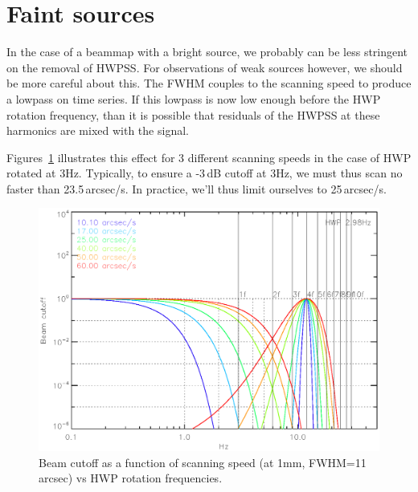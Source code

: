 \documentclass[a4paper,10pt]{article}
\begin{document}
\section{Faint sources}

In the case of a beammap with a bright source, we probably can be less stringent
on the removal of HWPSS. For observations of weak sources however, we should be
more careful about this. The FWHM couples to the scanning speed to produce a
lowpass on time series. If this lowpass is now low enough before the HWP
rotation frequency, than it is possible that residuals of the HWPSS at these
harmonics are mixed with the signal.

Figures~\ref{fig:bhss} illustrates this effect for 3 different scanning speeds
in the case of HWP rotated at 3Hz. Typically, to ensure a -3\,dB cutoff at 3Hz, we must
thus scan no faster than 23.5\,arcsec/s. In practice, we'll thus limit ourselves
to 25\,arcsec/s.

\begin{figure}
\begin{center}
\includegraphics[scale=1,angle=0]{Figures/beam_hwp_scanning_speed_2_98.eps}
\caption{Beam cutoff as a function of scanning speed (at 1mm,
  FWHM=11\,arcsec) vs HWP rotation frequencies.}
\label{fig:bhss}
\end{center}
\end{figure}


\begin{thebibliography}{}
\end{thebibliography}
\end{document}
